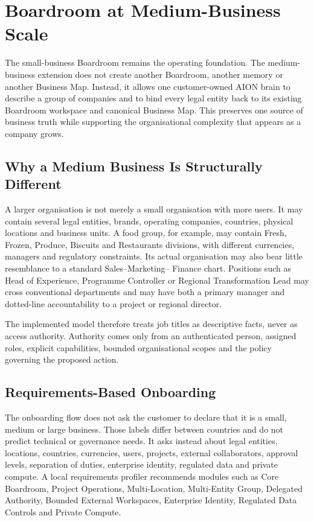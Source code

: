 \section{Boardroom at Medium-Business Scale}
\label{sec:aion-medium-business-boardroom}

The small-business Boardroom remains the operating foundation.  The medium-business
extension does not create another Boardroom, another memory or another Business Map.
Instead, it allows one customer-owned AION brain to describe a group of companies and to
bind every legal entity back to its existing Boardroom workspace and canonical Business
Map.  This preserves one source of business truth while supporting the organisational
complexity that appears as a company grows.

\subsection{Why a Medium Business Is Structurally Different}

A larger organisation is not merely a small organisation with more users.  It may contain
several legal entities, brands, operating companies, countries, physical locations and
business units.  A food group, for example, may contain Fresh, Frozen, Produce, Biscuits
and Restaurants divisions, with different currencies, managers and regulatory constraints.
Its actual organisation may also bear little resemblance to a standard Sales--Marketing--
Finance chart.  Positions such as Head of Experience, Programme Controller or Regional
Transformation Lead may cross conventional departments and may have both a primary manager
and dotted-line accountability to a project or regional director.

The implemented model therefore treats job titles as descriptive facts, never as access
authority.  Authority comes only from an authenticated person, assigned roles, explicit
capabilities, bounded organisational scopes and the policy governing the proposed action.

\subsection{Requirements-Based Onboarding}

The onboarding flow does not ask the customer to declare that it is a small, medium or large
business.  Those labels differ between countries and do not predict technical or governance
needs.  It asks instead about legal entities, locations, countries, currencies, users, projects,
external collaborators, approval levels, separation of duties, enterprise identity, regulated
data and private compute.  A local requirements profiler recommends modules such as Core
Boardroom, Project Operations, Multi-Location, Multi-Entity Group, Delegated Authority, Bounded
External Workspaces, Enterprise Identity, Regulated Data Controls and Private Compute.

